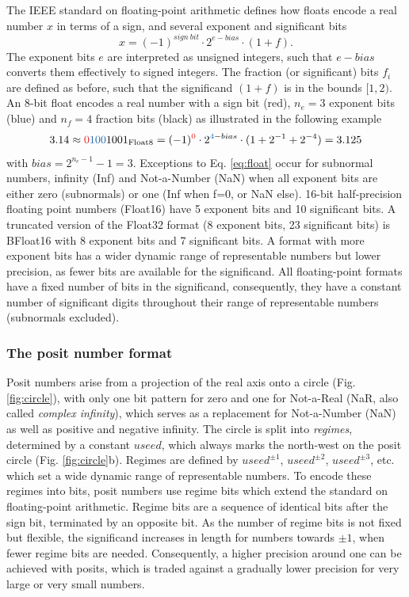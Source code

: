 \documentclass[draft]{agujournal2019}
\newcommand{\op}{\operatorname}
\begin{document}
The IEEE standard on floating-point arithmetic defines how floats encode a real
number $x$ in terms of a sign, and several exponent and significant bits
\begin{equation}
x = (-1)^{sign~bit} \cdot 2^{e-bias} \cdot (1+f).
\label{eq:float}
\end{equation}
The exponent bits $e$ are interpreted as unsigned integers, such that $e-bias$
converts them effectively to signed integers. The fraction (or significant) bits
$f_i$ are defined as before, such that the significand $(1+f)$ is in the bounds
$[1,2)$. An 8-bit float encodes a real number with a sign bit (red), $n_e = 3$
exponent bits (blue) and $n_f=4$ fraction bits (black) as illustrated in the
following example
\begin{equation}
3.14 \approx {\color{psign}0}{\color{pexpo}100}1001_{\op{Float8}} =
(-1)^{\color{psign}0} \cdot 2^{{\color{pexpo}4}-bias} \cdot (1+2^{-1}+2^{-4}) =
3.125
\label{eq:posit_pos}
\end{equation}
with $bias=2^{n_e-1} - 1 = 3$. Exceptions to Eq. \ref{eq:float} occur for
subnormal numbers, infinity (Inf) and Not-a-Number (NaN) when all exponent bits
are either zero (subnormals) or one (Inf when f=0, or NaN else). 16-bit half-precision
floating point numbers (Float16) have 5 exponent bits and 10 significant bits.
A truncated version of the Float32 format (8 exponent bits, 23 significant bits)
is BFloat16 with 8 exponent bits and 7 significant bits. A format with more exponent
bits has a wider dynamic range of representable numbers but lower precision, as
fewer bits are available for the significand. All floating-point formats have a
fixed number of bits in the significand, consequently, they have a constant
number of significant digits throughout their range of representable numbers
(subnormals excluded).

\subsubsection{The posit number format}
\label{sec:posit_methods}

Posit numbers arise from a projection of the real axis onto a circle (Fig. \ref{fig:circle}),
with only one bit pattern for zero and one for Not-a-Real (NaR, also called \emph{complex infinity}),
which serves as a replacement for Not-a-Number (NaN) as well as positive and negative infinity.
The circle is split into \emph{regimes}, determined by a constant $useed$, which
always marks the north-west on the posit circle (Fig. \ref{fig:circle}b). Regimes
are defined by $useed^{\pm1}$, $useed^{\pm2}$, $useed^{\pm3}$, etc. which set a
wide dynamic range of representable numbers. To encode these regimes into bits,
posit numbers use regime bits which extend the standard on floating-point arithmetic.
Regime bits are a sequence of identical bits after the sign bit, terminated by an
opposite bit. As the number of regime bits is not fixed but flexible, the significand
increases in length for numbers towards $\pm1$, when fewer regime bits are needed.
Consequently, a higher precision around one can be achieved with posits, which
is traded against a gradually lower precision for very large or very small numbers.
\end{document}
